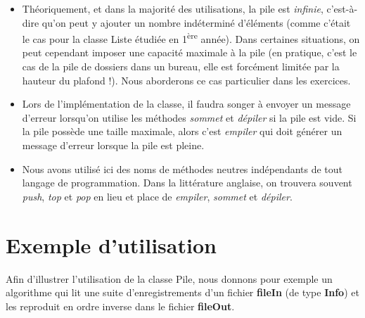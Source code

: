 		\begin{itemize}
			\item 
				Théoriquement, et dans la majorité des utilisations, la pile 
				est \textit{infinie}, c'est-à-dire qu'on peut y ajouter un
				nombre indéterminé d'éléments (comme c'était le cas pour la 
				classe Liste étudiée en 1\textsuperscript{ère} année). Dans
				certaines situations, on peut cependant imposer une capacité 
				maximale à la pile (en pratique, c'est le cas de la pile
				de dossiers dans un bureau, elle est forcément limitée par 
				la hauteur du plafond !). Nous aborderons ce cas particulier
				dans les exercices.
			\item 
				Lors de l'implémentation de la classe, il faudra songer à envoyer 
				un message d'erreur lorsqu'on utilise les méthodes
				\textit{sommet} et \textit{dépiler} si la pile est vide. 
				Si la pile possède une taille maximale, alors c'est
				\textit{empiler} qui doit générer un message d'erreur 
				lorsque la pile est pleine.
			\item
				Nous avons utilisé ici des noms de méthodes neutres indépendants 
				de tout langage de programmation. Dans la littérature
				anglaise, on trouvera souvent \textit{push}, \textit{top} et 
				\textit{pop} en lieu et place de \textit{empiler},
				\textit{sommet} et \textit{dépiler}.
		\end{itemize}
		

\section{Exemple d'utilisation}

	Afin d'illustrer l'utilisation de la classe Pile, nous donnons 
	pour exemple un algorithme qui lit une suite d'enregistrements d'un 
	fichier \textbf{fileIn} (de type \textbf{Info}) et les reproduit en 
	ordre inverse dans le fichier \textbf{fileOut}.
	
	
